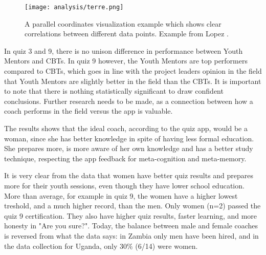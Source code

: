 \begin{figure}[h]
    \centering
    \texttt{[image: analysis/terre.png]}
    \caption{A parallel coordinates visualization example which shows clear correlations between different data points. Example from Lopez \cite{une-terre}.}
    \label{fig:terre}
\end{figure}



In quiz 3 and 9, there is no unison difference in performance between Youth Mentors and CBTs. In quiz 9 however, the Youth Mentors are top performers compared to CBTs, which goes in line with the project leaders opinion in the field that Youth Mentors are slightly better in the field than the CBTs. It is important to note that there is nothing statistically significant to draw confident conclusions. Further research needs to be made, as a connection between how a coach performs in the field versus the app is valuable. %



The results shows that the ideal coach, according to the quiz app, would be a woman, since she has better knowledge in spite of having less formal education. She prepares more, is more aware of her own knowledge and has a better study technique, respecting the app feedback for meta-cognition and meta-memory.

It is very clear from the data that women have better quiz results and prepares more for their youth sessions, even though they have lower school education. More than average, for example in quiz 9, the women have a higher lowest treshold, and a much higher record, than the men. Only women (n=2) passed the quiz 9 certification. They also have higher quiz results, faster learning, and more honesty in "Are you sure?". Today, the balance between male and female coaches is reversed from what the data says: in Zambia only men have been hired, and in the data collection for Uganda, only 30\% (6/14) were women.

